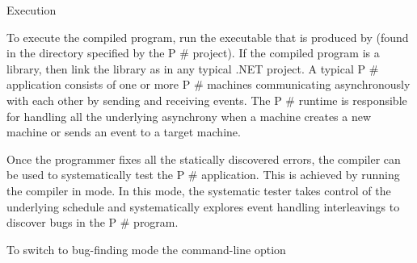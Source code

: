 \documentclass{article}
\begin{document}
\begin{mdDiv}[class={body,madoko},elem={body},line-adjust={0}]
{{}%
{}Execution}\begin{mdP}[data-line={843}]%
{}To execute the compiled program, run the executable that is produced by %
{}%
{}
(found in the directory specified by the P%
{}\#%
{} project). If the compiled program is a library,
then link the library as in any typical .NET project.
A typical P%
{}\#%
{} application consists of one or more P%
{}\#%
{} machines communicating asynchronously
with each other by sending and receiving events. The P%
{}\#%
{} runtime is responsible for handling
all the underlying asynchrony when a machine creates a new machine or sends an event to a
target machine.%
\end{mdP}%
\begin{mdP}[data-line={853}]%
{}Once the programmer fixes all the statically discovered errors, the compiler can be used
to systematically test the P%
{}\#%
{} application. This is achieved by running the compiler in
{}%
{} mode. In this mode, the systematic tester takes control of the underlying
schedule and systematically explores event handling interleavings to discover bugs in the
P%
{}\#%
{} program.%
\end{mdP}%
\begin{mdP}[class={indent},data-line={859}]%
{}To switch to bug-finding mode the command-line option %

\end{mdP}
\end{mdDiv}
\end{document}
